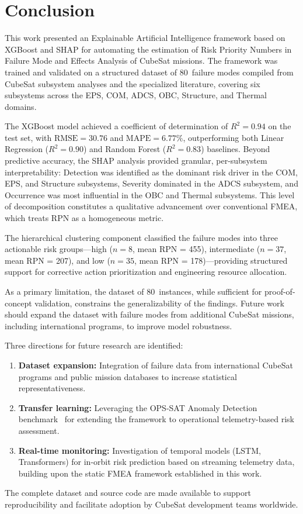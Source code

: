 \section{Conclusion}
\label{sec:conclusion}

This work presented an Explainable Artificial Intelligence framework based on XGBoost and SHAP for automating the estimation of Risk Priority Numbers in Failure Mode and Effects Analysis of CubeSat missions. The framework was trained and validated on a structured dataset of 80~failure modes compiled from CubeSat subsystem analyses and the specialized literature, covering six subsystems across the EPS, COM, ADCS, OBC, Structure, and Thermal domains.

The XGBoost model achieved a coefficient of determination of $R^2 = 0.94$ on the test set, with $\text{RMSE} = 30.76$ and $\text{MAPE} = 6.77\%$, outperforming both Linear Regression ($R^2 = 0.90$) and Random Forest ($R^2 = 0.83$) baselines. Beyond predictive accuracy, the SHAP analysis provided granular, per-subsystem interpretability: Detection was identified as the dominant risk driver in the COM, EPS, and Structure subsystems, Severity dominated in the ADCS subsystem, and Occurrence was most influential in the OBC and Thermal subsystems. This level of decomposition constitutes a qualitative advancement over conventional FMEA, which treats RPN as a homogeneous metric.

The hierarchical clustering component classified the failure modes into three actionable risk groups---high ($n=8$, mean RPN = 455), intermediate ($n=37$, mean RPN = 207), and low ($n=35$, mean RPN = 178)---providing structured support for corrective action prioritization and engineering resource allocation.

As a primary limitation, the dataset of 80~instances, while sufficient for proof-of-concept validation, constrains the generalizability of the findings. Future work should expand the dataset with failure modes from additional CubeSat missions, including international programs, to improve model robustness.

Three directions for future research are identified:
\begin{enumerate}
\item \textbf{Dataset expansion:} Integration of failure data from international CubeSat programs and public mission databases to increase statistical representativeness.
\item \textbf{Transfer learning:} Leveraging the OPS-SAT Anomaly Detection benchmark~\cite{ruszczak2025opssat} for extending the framework to operational telemetry-based risk assessment.
\item \textbf{Real-time monitoring:} Investigation of temporal models (LSTM, Transformers) for in-orbit risk prediction based on streaming telemetry data, building upon the static FMEA framework established in this work.
\end{enumerate}

The complete dataset and source code are made available to support reproducibility and facilitate adoption by CubeSat development teams worldwide.
